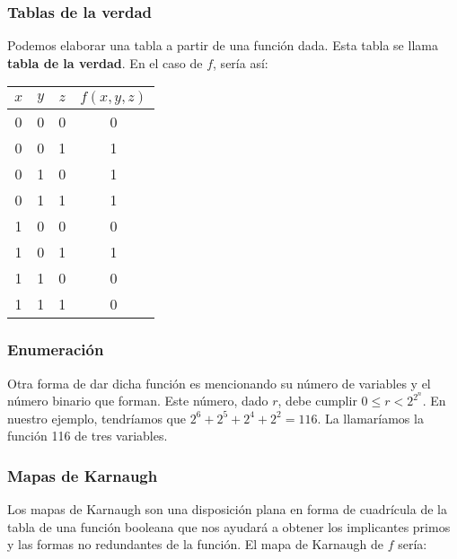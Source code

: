 \subsubsection{Tablas de la verdad}
Podemos elaborar una tabla a partir de una función dada. Esta tabla se llama \textbf{tabla de la verdad}. En el caso de $f$, sería así:
\begin{center}
    \begin{tabular}{ |c|c|c||c|  }
        \hline
        $x$ & $y$ & $z$ & $f(x,y,z)$ \\
        \hline
        0   & 0   & 0   & 0          \\
        0   & 0   & 1   & 1          \\
        0   & 1   & 0   & 1          \\
        0   & 1   & 1   & 1          \\
        1   & 0   & 0   & 0          \\
        1   & 0   & 1   & 1          \\
        1   & 1   & 0   & 0          \\
        1   & 1   & 1   & 0          \\
        \hline
    \end{tabular}
\end{center}

\subsubsection{Enumeración}
Otra forma de dar dicha función es mencionando su número de variables y el número binario que forman. Este número, dado $r$, debe cumplir $0 \leq r < 2^{2^n}$.
En nuestro ejemplo, tendríamos que $2^6+2^5+2^4+2^2 = 116$. La llamaríamos la función 116 de tres variables.

\subsubsection{Mapas de Karnaugh}
Los mapas de Karnaugh son una disposición plana en forma de cuadrícula de la tabla de una función booleana que nos ayudará a obtener los implicantes primos y las formas no redundantes de la función.
El mapa de Karnaugh de $f$ sería:
\begin{center}
    \begin{Karnaugh_2x4}
    \end{Karnaugh_2x4}
\end{center}

